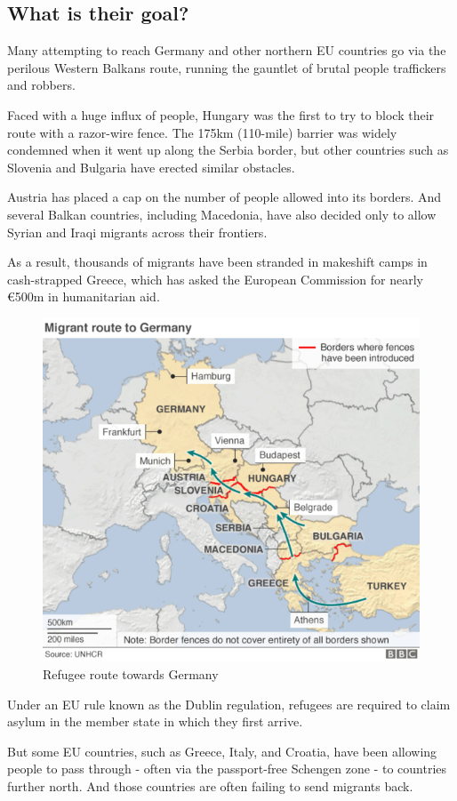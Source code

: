 \subsection{What is their goal?}
Many attempting to reach Germany and other northern EU countries go via the perilous Western Balkans route, running the gauntlet of brutal people traffickers and robbers.

Faced with a huge influx of people, Hungary was the first to try to block their route with a razor-wire fence. The 175km (110-mile) barrier was widely condemned when it went up along the Serbia border, but other countries such as Slovenia and Bulgaria have erected similar obstacles.

Austria has placed a cap on the number of people allowed into its borders. And several Balkan countries, including Macedonia, have also decided only to allow Syrian and Iraqi migrants across their frontiers.

As a result, thousands of migrants have been stranded in makeshift camps in cash-strapped Greece, which has asked the European Commission for nearly €500m in humanitarian aid. 

\begin{figure}[!h]
	\begin{center}
		\includegraphics[width=0.7\linewidth]{images/journey_to_germany}
		\caption{Refugee route towards Germany}
	\end{center}
\end{figure}

Under an EU rule known as the Dublin regulation, refugees are required to claim asylum in the member state in which they first arrive.

But some EU countries, such as Greece, Italy, and Croatia, have been allowing people to pass through - often via the passport-free Schengen zone - to countries further north. And those countries are often failing to send migrants back.

